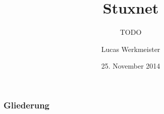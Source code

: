 \documentclass{beamer}
\title{Stuxnet}
\subtitle{TODO}
\author{Lucas Werkmeister}
\date{25. November 2014}
\begin{document}
\begin{frame}
  \titlepage
\end{frame}

\begin{frame}
  \frametitle{Gliederung}
  \tableofcontents
\end{frame}
\end{document}
